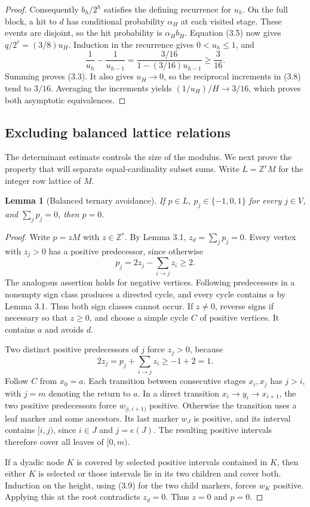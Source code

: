 \documentclass[reqno]{amsart}
\newtheorem{lemma}[theorem]{Lemma}
\theoremstyle{remark}
\numberwithin{equation}{section}
\newcommand{\Z}{\mathbb{Z}}
\begin{document}
\begin{proof}
Consequently $b_h/2^h$ satisfies the defining recurrence for $u_h$.  On the full block, a hit to
$d$ has conditional probability $\alpha_H$ at each visited stage.  These events are disjoint, so
the hit probability is $\alpha_Hb_H$.  Equation (3.5) now gives $q/2^r=(3/8)u_H$.  Induction
in the recurrence gives $0<u_h\leq 1$, and
\[
\frac{1}{u_h}-\frac{1}{u_{h-1}}
=\frac{3/16}{1-(3/16)u_{h-1}}\geq\frac{3}{16}.
\tag{3.8}
\]
Summing proves (3.3).  It also gives $u_H\to 0$, so the reciprocal increments in (3.8) tend to
$3/16$.  Averaging the increments yields $(1/u_H)/H\to 3/16$, which proves both asymptotic
equivalences.
\end{proof}

\subsection{Excluding balanced lattice relations}

The determinant estimate controls the size of the modulus.  We next prove the property that will
separate equal-cardinality subset sums.  Write $L=\Z^rM$ for the integer row lattice of $M$.

\begin{lemma}[Balanced ternary avoidance]
If $p\in L$, $p_j\in\{-1,0,1\}$ for every $j\in V$, and $\sum_jp_j=0$, then $p=0$.
\end{lemma}

\begin{proof}
Write $p=zM$ with $z\in\Z^r$.  By Lemma 3.1,
$z_d=\sum_jp_j=0$.  Every vertex with $z_j>0$ has a positive predecessor, since otherwise
\[
p_j=2z_j-\sum_{i\to j}z_i\geq 2.
\]
The analogous assertion holds for negative vertices.  Following predecessors in a nonempty sign
class produces a directed cycle, and every cycle contains $a$ by Lemma 3.1.  Thus both sign classes
cannot occur.  If $z\neq 0$, reverse signs if necessary so that $z\geq 0$, and choose a simple
cycle $C$ of positive vertices.  It contains $a$ and avoids $d$.

Two distinct positive predecessors of $j$ force $z_j>0$, because
\[
2z_j=p_j+\sum_{i\to j}z_i\geq -1+2=1.
\tag{3.9}
\]
Follow $C$ from $x_0=a$.  Each transition between consecutive stages $x_i,x_j$ has $j>i$,
with $j=m$ denoting the return to $a$.  In a direct transition $x_i\to y_i\to x_{i+1}$, the
two positive predecessors force $w_{[i,i+1)}$ positive.  Otherwise the transition uses a leaf
marker and some ancestors.  Its last marker $w_J$ is positive, and its interval contains
$[i,j)$, since $i\in J$ and $j=e(J)$.  The resulting positive intervals therefore cover all
leaves of $[0,m)$.

If a dyadic node $K$ is covered by selected positive intervals contained in $K$, then either $K$
is selected or those intervals lie in its two children and cover both.  Induction on the height,
using (3.9) for the two child markers, forces $w_K$ positive.  Applying this at the root
contradicts $z_d=0$.  Thus $z=0$ and $p=0$.
\end{proof}
\end{document}
